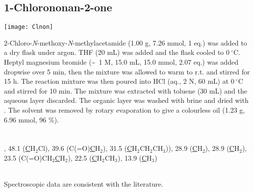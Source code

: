 {{{{{{%

\subsection{1-Chlorononan-2-one }


\begin{scheme}[H]
	\begin{center}
		\texttt{[image: Clnon]}
	\end{center}
\end{scheme}

2-Chloro-\textit{N}-methoxy-\textit{N}-methylacetamide (1.00 g, 7.26 mmol, 1 eq.) was added to a dry flask under argon. THF (20 mL) was added and the flask cooled to $0\ ^{\circ}$C. Heptyl magnesium bromide (\textasciitilde ~1 M, 15.0 mL, 15.0 mmol, 2.07 eq.) was added dropwise over 5 min, then the mixture was allowed to warm to r.t. and stirred for 15 h. The reaction mixture was then poured into HCl (aq., 2 N, 60 mL) at $0\ ^{\circ}$C and stirred for 10 min. The mixture was extracted with toluene (30 mL) and the aqueous layer discarded. The organic layer was washed with brine and dried with . The solvent was removed by rotary evaporation to give a colourless oil (1.23 g, 6.96 mmol, 96 \%).
\\[1\baselineskip]
\\[1\baselineskip]
\\[1\baselineskip]
, 
48.1 (\underline{C}H$_2$Cl), 
39.6 (C(=O)\underline{C}H$_2$), 
31.5 (\underline{C}H$_2$CH$_2$CH$_3$)), 
28.9 (\underline{C}H$_2$),
28.9 (\underline{C}H$_2$), 
23.5 (C(=O)CH$_2$\underline{C}H$_2$), 
22.5 (\underline{C}H$_2$CH$_3$), 
13.9 (\underline{C}H$_3$)}
\\[1\baselineskip]
Spectroscopic data are consistent with the literature\cite{Hodgkinson2011}.

}}}}}

